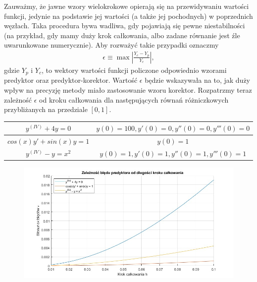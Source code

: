 \documentclass[a4paper,12pt]{article}
\begin{document}
Zauważmy, że jawne wzory wielokrokowe opierają się na przewidywaniu wartości funkcji, jedynie na podstawie jej wartości (a także jej pochodnych) w poprzednich węzłach. Taka procedura bywa wadliwa, gdy pojawiają się pewne niestabilności (na przykład, gdy mamy duży krok całkowania, albo zadane równanie jest źle uwarunkowane numerycznie). Aby rozważyć takie przypadki oznaczmy
\begin{align*}
    \epsilon \equiv \max\left| \frac{Y_c - Y_p}{Y_c} \right|,
\end{align*}
gdzie $Y_p$ i $Y_c$, to wektory wartości funkcji policzone odpowiednio wzorami predyktor oraz predyktor-korektor. Wartość $\epsilon$ będzie wskazywała na to, jak duży wpływ na precyzję metody miało zastosowanie wzoru korektor. Rozpatrzmy teraz zależność $\epsilon$ od kroku całkowania dla następujących równań różniczkowych przybliżanych na przedziale $[0,1]$.
\begin{table}[H]
\begin{tabular}{|cc|}
\hline
$y^{(IV)} + 4y = 0$      & $y(0) = 100, y'(0) = 0, y''(0) = 0, y'''(0) = 0$ \\ \hline
$cos(x)y' + sin(x)y = 1$ & $y(0) = 1$                                       \\ \hline
$y^{(IV)} - y = x^2$     & $y(0) = 1, y'(0) = 1, y''(0) = 1, y'''(0) = 1$   \\ \hline
\end{tabular}
\end{table}

\vspace{-20pt}
\begin{figure}[H]
    \hspace*{-1cm} 
    \includegraphics[width=1\textwidth]{predictor_error_graph.jpg}
\end{figure}
\end{document}
